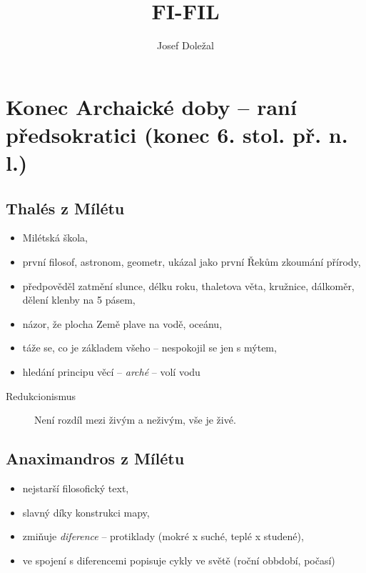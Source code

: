 \documentclass[11pt,a4paper,czech]{article}
\title{FI-FIL}
\author{Josef Doležal}
\begin{document}
\maketitle

\newpage

\section{Konec Archaické doby -- raní předsokratici (konec 6. stol. př. n. l.)}

\subsection{Thalés z Mílétu}

    \begin{itemize}
        \item Milétská škola,
        \item první filosof, astronom, geometr, ukázal jako první Řekům zkoumání přírody,
        \item předpověděl zatmění slunce, délku roku, thaletova věta, kružnice, dálkoměr, dělení klenby na 5 pásem,
        \item názor, že plocha Země plave na vodě, oceánu,
        \item táže se, co je základem všeho -- nespokojil se jen s mýtem,
        \item hledání principu věcí -- \textit{arché} -- volí vodu
    \end{itemize}

    \begin{description}
        \item[Redukcionismus] Není rozdíl mezi živým a neživým, vše je živé.
    \end{description}

\subsection{Anaximandros z Mílétu}

\begin{itemize}
    \item nejstarší filosofický text,
    \item slavný díky konstrukci mapy,
    \item zmiňuje \textit{diference} -- protiklady (mokré x suché, teplé x studené),
    \item ve spojení s diferencemi popisuje cykly ve světě (roční obbdobí, počasí)
\end{itemize}
\end{document}
